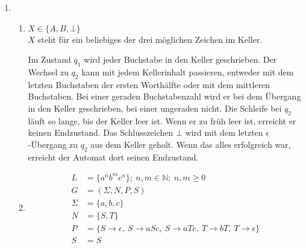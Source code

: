 \documentclass[a4paper]{scrartcl}
\title{\titleinfo}
\author{Arne Feil}
\date{\today}
\newcommand{\aufgabe}[1]{\item[\textbf{#1}]}
\begin{document}
\begin{enumerate}

\aufgabe{4.3}
\begin{enumerate}[1.]
 \item
 $X \in \{A,B,\bot\}$\\
 $X$ steht für ein beliebiges der drei möglichen Zeichen im Keller.\\

Im Zustand $q_1$ wird jeder Buchstabe in den Keller geschrieben.
Der Wechsel zu $q_2$ kann mit jedem Kellerinhalt passieren, entweder mit dem letzten Buchstaben der ersten Worthälfte oder mit dem mittleren Buchstaben.
Bei einer geraden Buchstabenzahl wird er bei dem Übergang in den Keller geschrieben, bei einer ungeraden nicht.
Die Schleife bei $q_2$ läuft so lange, bis der Keller leer ist. Wenn er zu früh leer ist, erreicht er keinen Endzustand.
Das Schlusszeichen $\bot$ wird mit dem letzten $\epsilon$-Übergang zu $q_2$ aus dem Keller geholt. Wenn das alles erfolgreich war, erreicht der Automat dort seinen Endzustand.

\item
\begin{align*}
 L &= \{a^n b^m c^n\};\ n,m\in\mathbb{N};\ n,m\geq 0\\
 G &= (\Sigma,N,P,S)\\
 \Sigma &= \{a,b,c\}\\ %
 N &= \{S,T\}\\
 P &= \{
   S\to \epsilon,\
   S\to aSc,\
   S\to aTc,\
   T\to bT,\
   T\to \epsilon
 \}\\
 S &= S
\end{align*}


\end{enumerate}
\end{enumerate}
\end{document}
